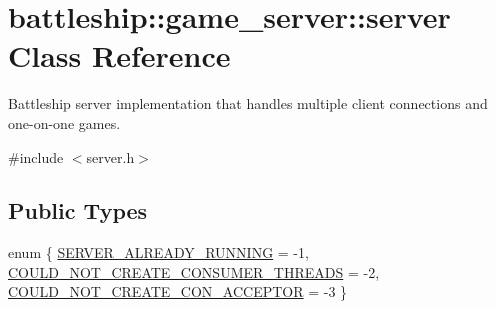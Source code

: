 \hypertarget{classbattleship_1_1game__server_1_1server}{}\section{battleship\+:\+:game\+\_\+server\+:\+:server Class Reference}
\label{classbattleship_1_1game__server_1_1server}


Battleship server implementation that handles multiple client connections and one-\/on-\/one games.  




{\ttfamily \#include $<$server.\+h$>$}

\subsection*{Public Types}
\begin{DoxyCompactItemize}
\item 
enum \{ \hyperlink{classbattleship_1_1game__server_1_1server_a65e83301c83373edf5d10cbf6d16bf18a1ac8cde70fcc3e1fc9379b7bba6c5833}{S\+E\+R\+V\+E\+R\+\_\+\+A\+L\+R\+E\+A\+D\+Y\+\_\+\+R\+U\+N\+N\+I\+NG} = -\/1, 
\hyperlink{classbattleship_1_1game__server_1_1server_a65e83301c83373edf5d10cbf6d16bf18adbf1fba50d1b1b3e22d8e33da6266ec4}{C\+O\+U\+L\+D\+\_\+\+N\+O\+T\+\_\+\+C\+R\+E\+A\+T\+E\+\_\+\+C\+O\+N\+S\+U\+M\+E\+R\+\_\+\+T\+H\+R\+E\+A\+DS} = -\/2, 
\hyperlink{classbattleship_1_1game__server_1_1server_a65e83301c83373edf5d10cbf6d16bf18aa83ea1931d9c62e8a5f2073a01b35ed8}{C\+O\+U\+L\+D\+\_\+\+N\+O\+T\+\_\+\+C\+R\+E\+A\+T\+E\+\_\+\+C\+O\+N\+\_\+\+A\+C\+C\+E\+P\+T\+OR} = -\/3
 \}
\end{DoxyCompactItemize}
